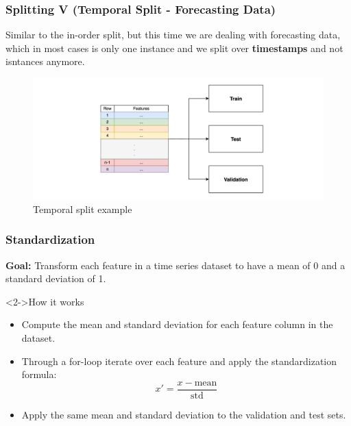 \documentclass[t,english]{beamer}
\begin{document}
\begin{frame}
  \frametitle{Splitting V (Temporal Split - Forecasting Data)}
    Similar to the in-order split, but this time we are dealing with forecasting data, which in most cases is only one instance and we split over \textbf{timestamps} and not isntances anymore.

    \begin{figure}[H]
        \includegraphics[width=1\textwidth]{figures/splitting/temporal_split.png}
        \caption{Temporal split example}
        \label{fig:temporal_split}
    \end{figure}
\end{frame}

\begin{frame}
  \frametitle{Standardization}
    \textbf{Goal:} Transform each feature in a time series dataset to have a mean of 0 and a standard deviation of 1.

    \begin{block}<2->{How it works}
      \begin{itemize}
        \item<2-> Compute the mean and standard deviation for each feature column in the dataset.
        \item<3-> Through a for-loop iterate over each feature and apply the standardization formula:
        \begin{equation}
              x' = \frac{x - \text{mean}}{\text{std}}
        \end{equation}
        \item<4-> Apply the same mean and standard deviation to the validation and test sets.
      \end{itemize}
    \end{block}
\end{frame}
\end{document}
